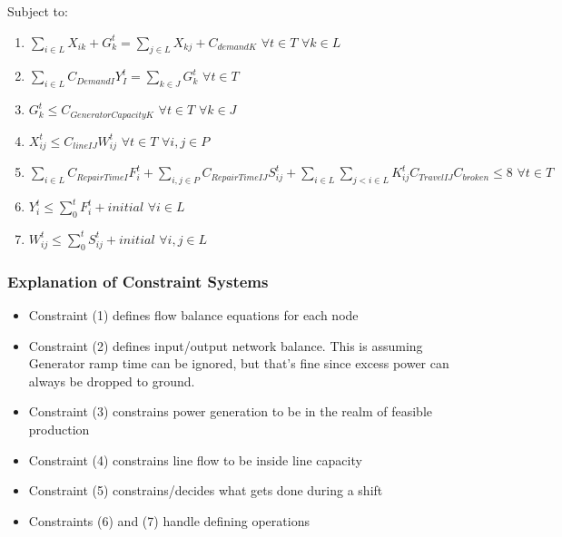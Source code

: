 \documentclass{article}
\begin{document}
	Subject to:
	\begin{enumerate}[label=(\arabic*), leftmargin=*, itemsep=0.4ex, before={\everymath{\displaystyle}}]%
		
		\item $\sum_{i \in L} X_{ik}+G_{k}^{t} = \sum_{j \in L} X_{kj}+C_{demandK} \hspace{4pt} \forall t \in T \hspace{4pt} \forall k \in L$ 
		\item $\sum_{i \in L} C_{DemandI}Y_I^t = \sum_{k \in J} G_k^t \hspace{4pt} \forall t \in T$
		\item $G_k^t \leq C_{GeneratorCapacityK} \hspace{4pt} \forall t\in T \hspace{4pt} \forall k \in J$
		\item $X_{ij}^t \leq C_{lineIJ}W_{ij}^t \hspace{4pt} \forall t \in T \hspace{4pt} \forall i,j \in P$
		\item $\sum_{i \in L} C_{RepairTimeI} F_{i}^t +\sum_{i,j \in P} C_{RepairTimeIJ} S_{ij}^t + \sum_{i \in L} \sum_{j<i \in L}  K_{ij}^t C_{TravelIJ} C_{broken} \leq 8 \hspace{4pt} \forall t \in T \hspace{4pt}$
		\item $Y_i^t \leq \sum_{0}^{t} F_i^t+initial \hspace{4pt} \forall i \in L$ 
		\item $W_{ij}^t \leq \sum_{0}^{t} S_{ij}^t+initial \hspace{4pt} \forall i,j \in L $
		
	\end{enumerate}
	\subsubsection{Explanation of Constraint Systems}
	\begin{itemize}
		\item Constraint (1) defines flow balance equations for each node
		\item Constraint (2) defines input/output network balance. This is assuming Generator ramp time can be ignored, but that's fine since excess power can always be dropped to ground.
		\item Constraint (3) constrains power generation to be in the realm of feasible production
		\item Constraint (4) constrains line flow to be inside line capacity
		\item Constraint (5) constrains/decides what gets done during a shift
		\item Constraints (6) and (7) handle defining operations
		\end{itemize}
\end{document}
